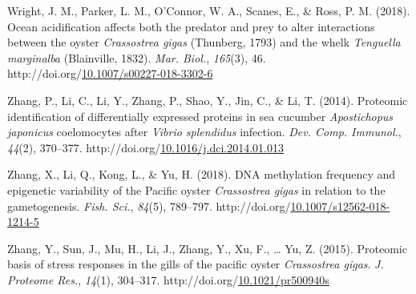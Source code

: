 \documentclass [11pt, proquest] {uwthesis}[2015/03/03]
\newlength{\cslhangindent}
\newenvironment{CSLReferences}%
{\setlength{\parindent}{0pt}%
\everypar{\setlength{\hangindent}{\cslhangindent}}\ignorespaces}%
{\par}
\begin{document}
\begin{CSLReferences}{1}{0}
\leavevmode\hypertarget{ref-Wright2018}{}%
Wright, J. M., Parker, L. M., O'Connor, W. A., Scanes, E., \& Ross, P. M. (2018). {Ocean acidification affects both the predator and prey to alter interactions between the oyster \emph{Crassostrea gigas} (Thunberg, 1793) and the whelk \emph{Tenguella marginalba} (Blainville, 1832)}. \emph{Mar. Biol.}, \emph{165}(3), 46. http://doi.org/\href{https://doi.org/10.1007/s00227-018-3302-6}{10.1007/s00227-018-3302-6}

\leavevmode\hypertarget{ref-Zhang2014}{}%
Zhang, P., Li, C., Li, Y., Zhang, P., Shao, Y., Jin, C., \& Li, T. (2014). {Proteomic identification of differentially expressed proteins in sea cucumber \emph{Apostichopus japonicus} coelomocytes after \emph{Vibrio splendidus} infection}. \emph{Dev. Comp. Immunol.}, \emph{44}(2), 370--377. http://doi.org/\href{https://doi.org/10.1016/j.dci.2014.01.013}{10.1016/j.dci.2014.01.013}

\leavevmode\hypertarget{ref-Zhang2018}{}%
Zhang, X., Li, Q., Kong, L., \& Yu, H. (2018). {DNA methylation frequency and epigenetic variability of the Pacific oyster \emph{Crassostrea gigas} in relation to the gametogenesis}. \emph{Fish. Sci.}, \emph{84}(5), 789--797. http://doi.org/\href{https://doi.org/10.1007/s12562-018-1214-5}{10.1007/s12562-018-1214-5}

\leavevmode\hypertarget{ref-Zhang2015}{}%
Zhang, Y., Sun, J., Mu, H., Li, J., Zhang, Y., Xu, F., \ldots{} Yu, Z. (2015). {Proteomic basis of stress responses in the gills of the pacific oyster \emph{Crassostrea gigas}}. \emph{J. Proteome Res.}, \emph{14}(1), 304--317. http://doi.org/\href{https://doi.org/10.1021/pr500940s}{10.1021/pr500940s}

\end{CSLReferences}
\end{document}
